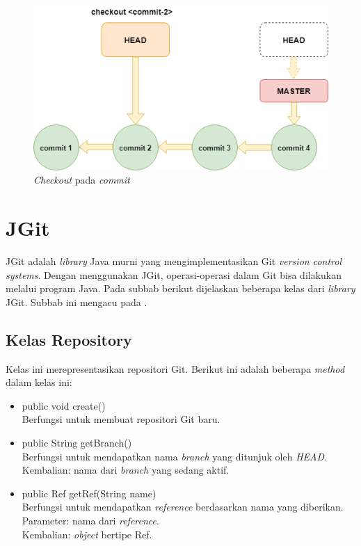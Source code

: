  
\begin{figure}[H]
	\centering
		\includegraphics[scale=0.6]{Gambar/gitcheckoutcommit.png}
	\caption{\textit{Checkout} pada \textit{commit}}
	\label{fig:git_checkout}
\end{figure}

\section{JGit}
\label{sec:jgit}
JGit adalah \textit{library} Java murni yang mengimplementasikan Git \textit{version control systems}\cite{JGit}. Dengan menggunakan JGit, operasi-operasi dalam Git bisa dilakukan melalui program Java. Pada subbab berikut dijelaskan beberapa kelas dari \textit{library} JGit. Subbab ini mengacu pada \cite{JGit_java_doc}. 

\subsection{Kelas Repository}
\label{subsec:repository}
Kelas ini merepresentasikan repositori Git. Berikut ini adalah beberapa \textit{method} dalam kelas ini:
\begin{itemize}
\item public void create()\\
Berfungsi untuk membuat repositori Git baru. 
\item public String getBranch()\\
Berfungsi untuk mendapatkan nama \textit{branch} yang ditunjuk oleh \textit{HEAD}.\\
Kembalian: nama dari \textit{branch} yang sedang aktif.
\item public Ref getRef(String name)\\
Berfungsi untuk mendapatkan \textit{reference} berdasarkan nama yang diberikan.\\
Parameter: nama dari \textit{reference}.\\
Kembalian: \textit{object} bertipe Ref.
\end{itemize} 

